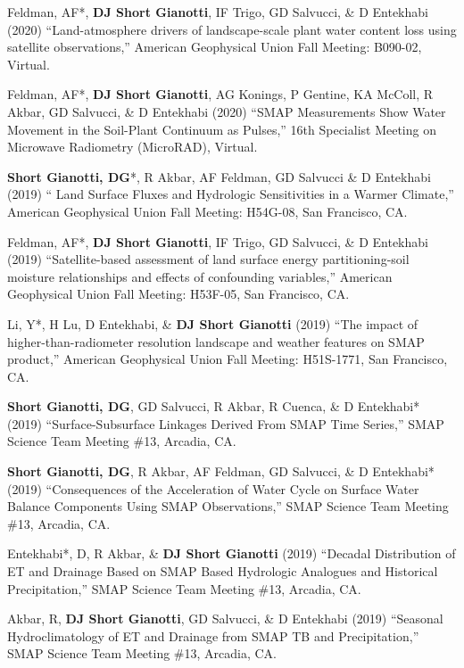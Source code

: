 \documentclass[10pt, a4paper]{article}
\newcommand{\lbr}{\vspace*{12pt}}
\newcommand{\years}[1]{\mbox{}\marginnote{\scriptsize #1}} %
\begin{document}
\years{2020}Feldman, AF*, \textbf{DJ Short Gianotti}, IF Trigo, GD Salvucci, \& D Entekhabi (2020) ``Land-atmosphere drivers of landscape-scale plant water content loss using satellite observations,'' American Geophysical Union Fall Meeting: B090-02, Virtual.\lbr

\years{2020}Feldman, AF*, \textbf{DJ Short Gianotti}, AG Konings, P Gentine, KA McColl, R Akbar, GD Salvucci, \& D Entekhabi (2020) ``SMAP Measurements Show Water Movement in the Soil-Plant Continuum as Pulses,'' 16th Specialist Meeting on Microwave Radiometry (MicroRAD), Virtual.\lbr %


\years{2019}\textbf{Short Gianotti, DG}*, R Akbar, AF Feldman, GD Salvucci \& D Entekhabi (2019) `` Land Surface Fluxes and Hydrologic Sensitivities in a Warmer Climate,'' American Geophysical Union Fall Meeting: H54G-08, San Francisco, CA.\lbr %

\years{2019}Feldman, AF*, \textbf{DJ Short Gianotti}, IF Trigo, GD Salvucci, \& D Entekhabi (2019) ``Satellite-based assessment of land surface energy partitioning-soil moisture relationships and effects of confounding variables,'' American Geophysical Union Fall Meeting: H53F-05, San Francisco, CA.\lbr %

\years{2019}Li, Y*, H Lu, D Entekhabi, \& \textbf{DJ Short Gianotti} (2019) ``The impact of higher-than-radiometer resolution landscape and weather features on SMAP product,'' American Geophysical Union Fall Meeting: H51S-1771, San Francisco, CA.\lbr %

\years{2019}\textbf{Short Gianotti, DG}, GD Salvucci, R Akbar, R Cuenca, \& D Entekhabi* (2019) ``Surface-Subsurface Linkages Derived From SMAP Time Series,'' SMAP Science Team Meeting \#13, Arcadia, CA.\lbr %

\years{2019}\textbf{Short Gianotti, DG}, R Akbar, AF Feldman, GD Salvucci, \& D Entekhabi* (2019) ``Consequences of the Acceleration of Water Cycle on Surface Water Balance Components Using SMAP Observations,'' SMAP Science Team Meeting \#13, Arcadia, CA.\lbr %

\years{2019}Entekhabi*, D, R Akbar, \& \textbf{DJ Short Gianotti} (2019) ``Decadal Distribution of ET and Drainage Based on SMAP Based Hydrologic Analogues and Historical Precipitation,'' SMAP Science Team Meeting \#13, Arcadia, CA.\lbr %

\years{2019}Akbar, R, \textbf{DJ Short Gianotti}, GD Salvucci, \& D Entekhabi (2019) ``Seasonal Hydroclimatology of ET and Drainage from SMAP TB and Precipitation,'' SMAP Science Team Meeting \#13, Arcadia, CA.\lbr %
\end{document}
